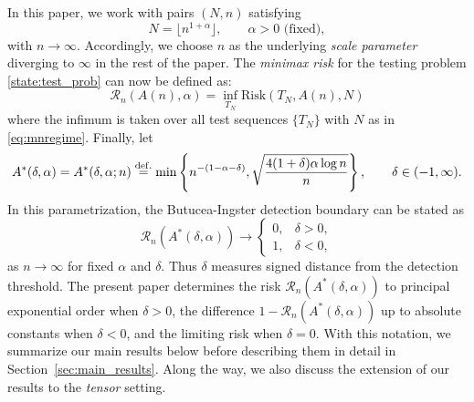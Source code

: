 \documentclass[11pt,reqno,letterpaper]{amsart}
\numberwithin{equation}{section}
\theoremstyle{plain}
\begin{document}
In this paper, we work with pairs $(N, n)$ satisfying
\begin{equation}\label{eq:mnregime}
N = \lfloor n^{1+\alpha}\rfloor,\qquad \alpha > 0 \mbox{ (fixed)},
\end{equation}
with $n \to \infty$. Accordingly, we choose $n$ as the underlying {\em scale parameter} 
diverging to $\infty$ in the rest of the paper. The {\em minimax risk} for the testing problem 
\eqref{state:test_prob}  can now be defined as:
\begin{equation}\label{def:minmax_risk}
\mathcal R_n(A(n), \alpha) = \inf_{T_N} \mathrm{Risk}(T_N, A(n), N)
\end{equation}
where the infimum is taken over all test sequences $\{T_N\}$ with $N$ as in 
\eqref{eq:mnregime}. Finally, let
\begin{equation}\label{def:Adelta}
A^\ast(\delta, \alpha) = A^\ast(\delta, \alpha; n)\stackrel{{\rm def.}}{=}
\min\left\{n^{-(1-\alpha-\delta)},
\sqrt{\frac{4(1+\delta)\alpha\log n}{n}}\right\},
\qquad \delta\in(-1,\infty).
\end{equation}
In this parametrization, the Butucea-Ingster detection boundary \citep{butuceasubmatrix2013} can be stated as
\[
    \mathcal R_n(A^\ast(\delta, \alpha))\to
    \begin{cases}
        0, & \delta>0,\\
        1, & \delta<0,
    \end{cases}
\]
as $n \to \infty$ for fixed $\alpha$ and $\delta$. Thus $\delta$ measures signed distance 
from the detection threshold. The present paper determines the risk $\mathcal R_n(A^\ast(\delta, \alpha))$ to principal exponential order when $\delta > 0$, the difference $1 -\mathcal R_n(A^\ast(\delta, \alpha))$ up to absolute constants when $\delta < 0$, and 
the limiting risk when $\delta = 0$. With this notation, we summarize our main results below 
before describing them in detail in Section~\ref{sec:main_results}. Along the way, we also 
discuss the extension of our results to the {\em tensor} setting.
\end{document}
